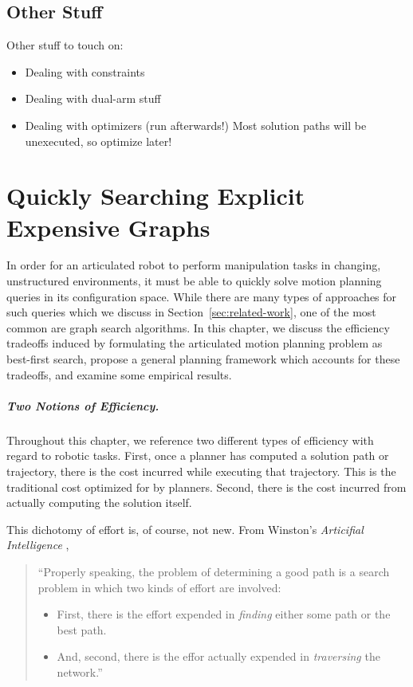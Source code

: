 \documentclass{report}
\begin{document}
\section{Other Stuff}

Other stuff to touch on:
\begin{itemize}
\item Dealing with constraints
\item Dealing with dual-arm stuff
\item Dealing with optimizers (run afterwards!)
   Most solution paths will be unexecuted, so optimize later!
\end{itemize}


\newpage
\chapter{Quickly Searching Explicit Expensive Graphs}
\label{chap:inflate}

In order for an articulated robot to perform manipulation tasks
in changing, unstructured environments,
it must be able to quickly solve motion planning queries in its
configuration space.
While there are many types of approaches for such queries
which we discuss in Section~\ref{sec:related-work},
one of the most common are graph search algorithms.
In this chapter,
we discuss the efficiency tradeoffs induced by formulating
the articulated motion planning problem as best-first search,
propose a general planning framework which accounts for these tradeoffs,
and examine some empirical results.

\paragraph{Two Notions of Efficiency.}

Throughout this chapter,
we reference two different types of efficiency
with regard to robotic tasks.
First, once a planner has computed a solution path or trajectory,
there is the cost incurred while executing that trajectory.
This is the traditional cost optimized for by planners.
Second, there is the cost incurred from actually computing the solution
itself.

This dichotomy of effort is, of course, not new.
From Winston's \emph{Articifial Intelligence} \cite{winston1977ai},
\begin{quote}
   ``Properly speaking, the problem of determining a good path is a search
   problem in which two kinds of effort are involved:
   \begin{itemize}
   \item First, there is the effort expended in \emph{finding} either
      some path or the best path.
   \item And, second, there is the effor actually expended in
      \emph{traversing} the network.''
   \end{itemize}
\end{quote}
\end{document}
